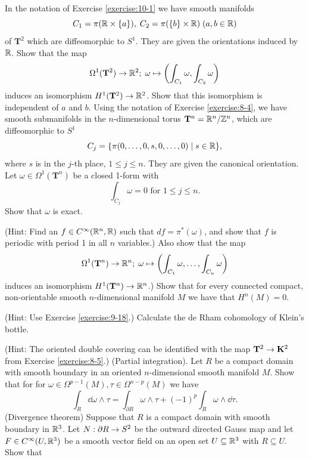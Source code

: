 \begin{enumerate}[label=\theexercise.\arabic*.,ref=\theexercise.\arabic*,leftmargin=2.7em]
\[    \]
  \NewItem In the notation of Exercise \ref{exercise:10-1} we have smooth manifolds
    \[
      {C}_{1} = \pi ( {\mathbb{R}\times \{ a\} }),\;{C}_{2} = \pi ( {\{ b\}  \times  \mathbb{R}}) \;( {a,b \in  \mathbb{R}})
    \]
    of ${\mathbf{T}}^{2}$ which are diffeomorphic to ${S}^{1}$. They are given the orientations induced by $\mathbb{R}$. Show that the map
    \[
      {\Omega }^{1}( {\mathbf{T}}^{2})  \rightarrow  {\ensuremath{\mathbb{R}}}^{2};\;\omega  \mapsto  \left( {\int_{{C}_{1}}\omega,\int_{{C}_{2}}\omega }\right)
    \]
    induces an isomorphism ${H}^{1}( {\mathbf{T}}^{2})  \rightarrow  {\ensuremath{\mathbb{R}}}^{2}$. Show that this isomorphism is independent of $a$ and $b$.
  \NewItem Using the notation of Exercise \ref{exercise:8-4}, we have smooth submanifolds in the $n$-dimensional torus ${\mathbf{T}}^{n} = {\mathbb{R}}^{n}/{\mathbb{Z}}^{n}$, which are diffeomorphic to ${S}^{1}$
    \[
      {C}_{j} = \{ \pi ( {0,\ldots,0,s,0,\ldots,0})  \mid  s \in  {\ensuremath{\mathbb{R}}}\},
    \]
    where $s$ is in the $j$-th place, $1 \leq  j \leq  n$. They are given the canonical orientation. Let $\omega  \in  {\Omega }^{1}( {\mathbf{T}}^{n})$ be a closed 1-form with
    \[
     \int_{{C}_{j}}\omega  = 0\text{ for }1 \leq  j \leq  n.
    \]
    Show that $\omega$ is exact.
    \par(Hint: Find an $f \in  {C}^{\infty }( {{\mathbb{R}}^{n},\mathbb{R}})$ such that ${df} = {\pi }^*( \omega )$, and show that $f$ is periodic with period 1 in all $n$ variables.)
    Also show that the map
    \[
      {\Omega }^{1}( {\mathbf{T}}^{n})  \rightarrow  {\ensuremath{\mathbb{R}}}^{n};\;\omega  \mapsto  \left( {\int_{{C}_{1}}\omega,\ldots,\int_{{C}_{n}}\omega }\right)
    \]
    induces an isomorphism ${H}^{1}( {\mathbf{T}}^{n})  \rightarrow  {\ensuremath{\mathbb{R}}}^{n}$.)
  \NewItem Show that for every connected compact, non-orientable smooth $n$-dimensional
    manifold $M$ we have that $H^n(M) = 0$.\par \par(Hint: Use Exercise \ref{exercise:9-18}.)
  \NewItem Calculate the de Rham cohomology of Klein's bottle.
    \par(Hint: The oriented double covering can be identified with the map ${\mathbf{T}}^{2} \rightarrow  {\mathbf{K}}^{2}$ from Exercise \ref{exercise:8-5}.)
  \NewItem (Partial integration). Let $R$ be a compact domain with smooth boundary in an oriented $n$-dimensional smooth manifold $M$. Show that for for $\omega  \in  {\Omega }^{p- 1}( M),\tau  \in  {\Omega }^{n- p}( M)$ we have
    \[
      \int_{R}{\dd\omega } \land  \tau  =\int_{\partial R}\omega  \land  \tau  + {(-1) }^{p}\int_{R}\omega  \land  {\dd\tau }.
    \]
  \NewItem (Divergence theorem) Suppose that $R$ is a compact domain with smooth boundary in ${{\mathbb{R}}}^{3}$. Let $N : \partial R \rightarrow  {S}^{2}$ be the outward directed Gauss map and let $F \in  {C}^{\infty }( {U,{\mathbb{R}}^{3}})$ be a smooth vector field on an open set $U \subseteq  {\ensuremath{\mathbb{R}}}^{3}$ with $R \subseteq  U$. Show that

\end{enumerate}

